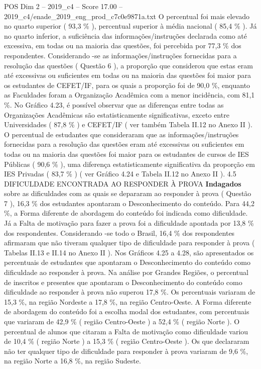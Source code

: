 \begin{textsample}{POS Dim 2 – 2019\_c4 – Score 17.00 – 2019\_c4/enade\_2019\_eng\_prod\_c7c0e9871a.txt}
O percentual foi mais elevado no quarto superior ( 93,3 \% ), percentual superior à média nacional ( 85,4 \% ).
Já no quarto inferior, a suficiência das informações/instruções declarada como até excessiva, em todas ou na maioria das questões, foi percebida por 77,3 \% dos respondentes.
Considerando -se as informações/instruções fornecidas para a resolução das questões ( Questão 6 ), a proporção que considerou que estas eram até excessivas ou suficientes em todas ou na maioria das questões foi maior para os estudantes de CEFET/IF, para os quais a proporção foi de 90,0 \%, enquanto as Faculdades foram a Organização Acadêmica com a menor incidência, com 81,1 \%.
No Gráfico 4.23, é possível observar que as diferenças entre todas as Organizações Acadêmicas são estatisticamente significativas, exceto entre Universidades ( 87,8 \% ) e CEFET/IF ( ver também Tabela II.12 no Anexo II ).
O percentual de estudantes que consideraram que as informações/instruções fornecidas para a resolução das questões eram até excessivas ou suficientes em todas ou na maioria das questões foi maior para os estudantes de cursos de IES Públicas ( 90,6 \% ), uma diferença estatisticamente significativa da proporção em IES Privadas ( 83,7 \% ) ( ver Gráfico 4.24 e Tabela II.12 no Anexo II ). 4.5 DIFICULDADE ENCONTRADA AO RESPONDER À PROVA \textbf{Indagados} sobre as dificuldades com as quais se depararam ao responder à prova ( Questão 7 ), 16,3 \% dos estudantes apontaram o Desconhecimento do conteúdo.
Para 44,2 \%, a Forma diferente de abordagem do conteúdo foi indicada como dificuldade.
Já a Falta de motivação para fazer a prova foi a dificuldade apontada por 13,8 \% dos respondentes.
Considerando -se todo o Brasil, 16,4 \% dos respondentes afirmaram que não tiveram qualquer tipo de dificuldade para responder à prova ( Tabelas II.13 e II.14 no Anexo II ).
Nos Gráficos 4.25 a 4.28, são apresentados os percentuais de estudantes que apontaram o Desconhecimento do conteúdo como dificuldade ao responder à prova.
Na análise por Grandes Regiões, o percentual de inscritos e presentes que apontaram o Desconhecimento do conteúdo como dificuldade ao responder à prova não superou 17,8 \%.
Os percentuais variaram de 15,3 \%, na região Nordeste a 17,8 \%, na região Centro-Oeste.
A Forma diferente de abordagem do conteúdo foi a escolha modal dos estudantes, com percentuais que variaram de 42,9 \% ( região Centro-Oeste ) a 52,4 \% ( região Norte ).
O percentual de alunos que citaram a Falta de motivação como dificuldade variou de 10,4 \% ( região Norte ) a 15,3 \% ( região Centro-Oeste ).
Os que declararam não ter qualquer tipo de dificuldade para responder à prova variaram de 9,6 \%, na região Norte a 16,8 \%, na região Sudeste.

\end{textsample}
